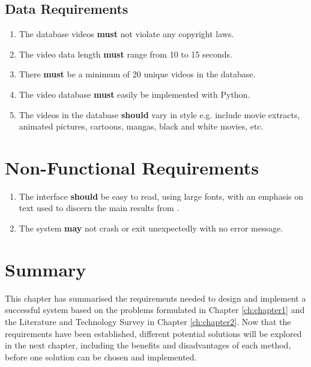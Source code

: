\subsection{Data Requirements}

\begin{enumerate}
    \item The database videos \textbf{must} not violate any copyright laws.
    \item The video data length \textbf{must} range from 10 to 15 seconds.
    \item There \textbf{must} be a minimum of 20 unique videos in the database.
    \item The video database \textbf{must} easily be implemented with Python.
    \item The videos in the database \textbf{should} vary in style e.g. include movie extracts, animated pictures, cartoons, mangas, black and white movies, etc.
    
\end{enumerate}

\section{Non-Functional Requirements}

\begin{enumerate}
    \item The interface \textbf{should} be easy to read, using large fonts, with an emphasis on text used to discern the main results from .
    \item The system \textbf{may} not crash or exit unexpectedly with no error message.
\end{enumerate}

\section{Summary}

This chapter has summarised the requirements needed to design and implement a successful system based on the problems formulated in Chapter \ref{ch:chapter1} and the Literature and Technology Survey in Chapter \ref{ch:chapter2}. Now that the requirements have been established, different potential solutions will be explored in the next chapter, including the benefits and disadvantages of each method, before one solution can be chosen and implemented.
